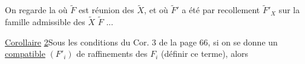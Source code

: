On regarde la 
où $\widetilde F$ est réunion des $\widetilde X$, et où $\widetilde F'$ a été
 par recollement    $\widetilde F'_X$
sur la famille admissible des $\widetilde X$ 
$\widetilde F$ ...

\uline{Corollaire} \uline{2}\quad Sous les conditions du Cor. 3
de la page 66, si on se donne un
\uline{ compatible} $(F'_i)$ de raffinements des
$F_i$ (définir ce terme), alors
